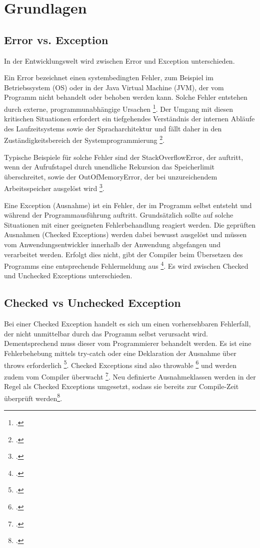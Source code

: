 \section{Grundlagen}
\subsection{Error vs. Exception}
In der Entwicklungswelt wird zwischen Error und Exception unterschieden.

Ein Error bezeichnet einen systembedingten Fehler, zum Beispiel im Betriebssystem (OS) oder in der Java Virtual Machine (JVM), der vom Programm nicht behandelt oder behoben werden kann. Solche Fehler entstehen durch externe, programmunabhängige Ursachen \footcite[Vgl. ][S. 517]{1Dev_Exp_Hand}. Der Umgang mit diesen kritischen Situationen erfordert ein tiefgehendes Verständnis der internen Abläufe des Laufzeitsystems sowie der Spracharchitektur und fällt daher in den Zuständigkeitsbereich der Systemprogrammierung \footcite[Vgl. ][S. 8]{3Exp_Hand_a}.

Typische Beispiele für solche Fehler sind der StackOverflowError, der auftritt, wenn der Aufrufstapel durch unendliche Rekursion das Speicherlimit überschreitet, sowie der OutOfMemoryError, der bei unzureichendem Arbeitsspeicher ausgelöst wird \footcite[Vgl. ][]{4Exp_Hand_b}.

Eine Exception (Ausnahme) ist ein Fehler, der im Programm selbst entsteht und während der Programmausführung auftritt. Grundsätzlich sollte auf solche Situationen mit einer geeigneten Fehlerbehandlung reagiert werden. Die geprüften Ausnahmen (Checked Exceptions) werden dabei bewusst ausgelöst und müssen vom Anwendungsentwickler innerhalb der Anwendung abgefangen und verarbeitet werden. Erfolgt dies nicht, gibt der Compiler beim Übersetzen des Programms eine entsprechende Fehlermeldung aus \footcite[Vgl.][S. 9]{3Exp_Hand_a}.
Es wird zwischen Checked und Unchecked Exceptions unterschieden.

\subsection{Checked vs Unchecked Exception}
Bei einer Checked Exception handelt es sich um einen vorhersehbaren Fehlerfall, der nicht unmittelbar durch das Programm selbst verursacht wird. Dementsprechend muss dieser vom Programmierer behandelt werden. Es ist eine Fehlerbehebung mittels try-catch oder eine Deklaration der Ausnahme über throws erforderlich \footcite[Vgl.][S. 517]{1Dev_Exp_Hand}. Checked Exceptions sind also throwable \footcite[Vgl.][S. 425]{2Java_Lang_Spec} und werden zudem vom Compiler überwacht \footcite[Vgl.][S. 9]{3Exp_Hand_a}. Neu definierte Ausnahmeklassen werden in der Regel als Checked Exceptions umgesetzt, sodass sie bereits zur Compile-Zeit überprüft werden\footcite[Vgl.][]{4Exp_Hand_b}.

